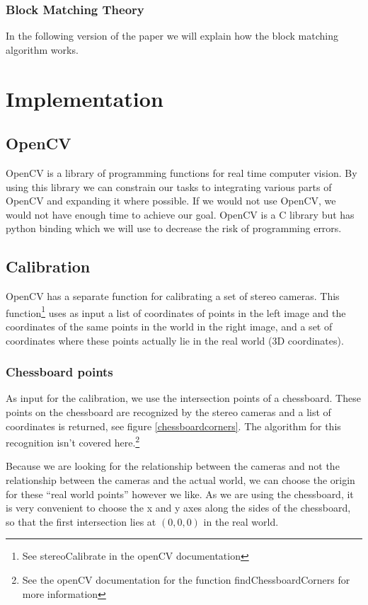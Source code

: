 \documentclass[a4paper]{article}
\begin{document}
\subsubsection{Block Matching Theory}
\label{bm_theory}
In the following version of the paper we will explain how the block
matching algorithm works.


\section{Implementation}

\subsection{OpenCV}
\label{opencv} OpenCV is a library of programming functions for real
time computer vision. By using this library we can constrain our tasks
to integrating various parts of OpenCV and expanding it where
possible. If we would not use OpenCV, we would not have enough time to
achieve our goal. OpenCV is a C library but has python binding which
we will use to decrease the risk of programming errors.

\subsection{Calibration}
\label{calib_implement} OpenCV has a separate function for calibrating
a set of stereo cameras. This function\footnote{See stereoCalibrate in
the openCV documentation} uses as input a list of coordinates of
points in the left image and the coordinates of the same points in the
world in the right image, and a set of coordinates where these points
actually lie in the real world (3D coordinates).

\subsubsection{Chessboard points} As input for the calibration, we use
the intersection points of a chessboard. These points on the
chessboard are recognized by the stereo cameras and a list of
coordinates is returned, see figure \ref{chessboardcorners}. The
algorithm for this recognition isn't covered here.\footnote{See the
openCV documentation for the function findChessboardCorners for more
information}

Because we are looking for the relationship between the cameras and
not the relationship between the cameras and the actual world, we can
choose the origin for these ``real world points'' however we like. As
we are using the chessboard, it is very convenient to choose the x and
y axes along the sides of the chessboard, so that the first
intersection lies at $(0, 0, 0)$ in the real world.
\end{document}
